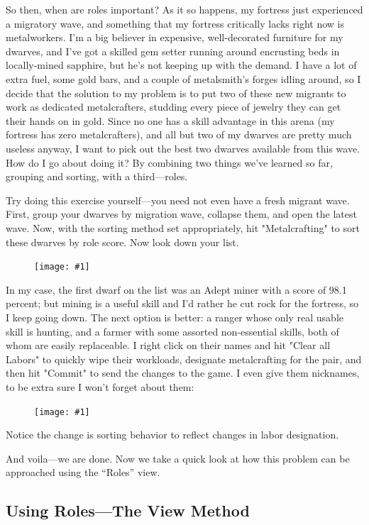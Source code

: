 \documentclass[]{article}
\newcommand{\fullfigure}[1] {
\begin{figure}[h!]
\texttt{[image: \#1]}
\end{figure}
}
\newcommand{\fullfigurecaption}[1] {
\begin{center}
\vspace{-12pt}
#1
\end{center}
}
\begin{document}
So then, when are roles important? As it so happens, my fortress just experienced a migratory wave, and
something that my fortress critically lacks right now is metalworkers. I'm a big believer in expensive,
well-decorated furniture for my dwarves, and I've got a skilled gem setter running around encrusting beds
in locally-mined sapphire, but he's not keeping up with the demand. I have a lot of extra fuel, some gold
bars, and a couple of metalsmith's forges idling around, so I decide that the solution to my problem is
to put two of these new migrants to work as dedicated metalcrafters, studding every piece of jewelry they
can get their hands on in gold. Since no one has a skill advantage in this arena (my fortress has zero
metalcrafters), and all but two of my dwarves are pretty much useless anyway, I want to pick out the best
two dwarves available from this wave. How do I go about doing it? By combining two things we've learned
so far, grouping and sorting, with a third---roles.

Try doing this exercise yourself---you need not even have a fresh migrant wave. First, group your dwarves
by migration wave, collapse them, and open the latest wave. Now, with the sorting method set
appropriately, hit "Metalcrafting" to sort these dwarves by role score. Now look down your list.

\fullfigure{Sec3Fig5}

In my case, the first dwarf on the list was an Adept miner with a score of 98.1 percent; but mining is a
useful skill and I'd rather he cut rock for the fortress, so I keep going down. The next option is
better: a ranger whose only real usable skill is hunting, and a farmer with some assorted non-essential
skills, both of whom are easily replaceable. I right click on their names and hit "Clear all Labors" to
quickly wipe their workloads, designate metalcrafting for the pair, and then hit "Commit" to send the
changes to the game. I even give them nicknames, to be extra sure I won't forget about them:

\fullfigure{Sec3Fig6}
\fullfigurecaption{Notice the change is sorting behavior to reflect changes in labor designation.}

And voila---we are done. Now we take a quick look at how this problem can be approached using the
``Roles'' view.

\newpage
\subsection{Using Roles---The View Method}
\label{sec:Using Roles---The View Method}
\end{document}
